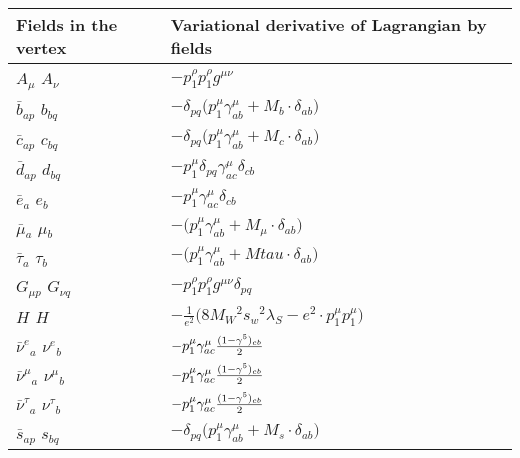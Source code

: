 \textwidth 17cm
\textheight 25cm
\hoffset -3cm
\voffset -1cm
\pagestyle{empty}

\begin{center}

\begin{tabular}{|l|l|} \hline
Fields in the vertex & Variational derivative of Lagrangian by fields \\ \hline
${A}_{\mu }$ \phantom{-} ${A}_{\nu }$ \phantom{-}  &
	$-p_1^\rho p_1^\rho g^{\mu \nu} $\\[2mm]
$\bar{b}{}_{a p }$ \phantom{-} $b{}_{b q }$ \phantom{-}  &
	$-\delta_{p q} \big(p_1^\mu \gamma_{a b}^\mu + M_b\cdot \delta_{a b} \big)$\\[2mm]
$\bar{c}{}_{a p }$ \phantom{-} $c{}_{b q }$ \phantom{-}  &
	$-\delta_{p q} \big(p_1^\mu \gamma_{a b}^\mu + M_c\cdot \delta_{a b} \big)$\\[2mm]
$\bar{d}{}_{a p }$ \phantom{-} $d{}_{b q }$ \phantom{-}  &
	$-p_1^\mu \delta_{p q} \gamma_{a c}^\mu \delta_{c b} $\\[2mm]
$\bar{e}{}_{a }$ \phantom{-} $e{}_{b }$ \phantom{-}  &
	$-p_1^\mu \gamma_{a c}^\mu \delta_{c b} $\\[2mm]
$\bar{\mu}{}_{a }$ \phantom{-} $\mu{}_{b }$ \phantom{-}  &
	$-\big(p_1^\mu \gamma_{a b}^\mu + M_\mu\cdot \delta_{a b} \big)$\\[2mm]
$\bar{\tau}{}_{a }$ \phantom{-} $\tau{}_{b }$ \phantom{-}  &
	$-\big(p_1^\mu \gamma_{a b}^\mu + Mtau\cdot \delta_{a b} \big)$\\[2mm]
${G}_{\mu p }$ \phantom{-} ${G}_{\nu q }$ \phantom{-}  &
	$-p_1^\rho p_1^\rho g^{\mu \nu} \delta_{p q} $\\[2mm]
${H}_{}$ \phantom{-} ${H}_{}$ \phantom{-}  &
	$-\frac{1}{ e{}^2 }\big(8 M_W{}^2  s_w{}^2  \lambda_S- e{}^2 \cdot p_1^\mu p_1^\mu \big)$\\[2mm]
$\bar{\nu}^e{}_{a }$ \phantom{-} $\nu^e{}_{b }$ \phantom{-}  &
	$-p_1^\mu \gamma_{a c}^\mu {(1-\gamma^5)_{c b}\over 2} $\\[2mm]
$\bar{\nu}^\mu{}_{a }$ \phantom{-} $\nu^\mu{}_{b }$ \phantom{-}  &
	$-p_1^\mu \gamma_{a c}^\mu {(1-\gamma^5)_{c b}\over 2} $\\[2mm]
$\bar{\nu}^\tau{}_{a }$ \phantom{-} $\nu^\tau{}_{b }$ \phantom{-}  &
	$-p_1^\mu \gamma_{a c}^\mu {(1-\gamma^5)_{c b}\over 2} $\\[2mm]
$\bar{s}{}_{a p }$ \phantom{-} $s{}_{b q }$ \phantom{-}  &
	$-\delta_{p q} \big(p_1^\mu \gamma_{a b}^\mu + M_s\cdot \delta_{a b} \big)$\\[2mm]

\end{tabular}
\end{center}
